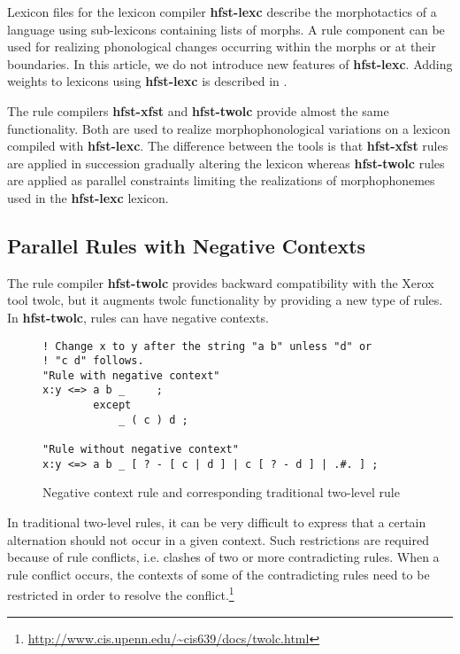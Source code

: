 \documentclass{llncs}
\begin{document}
Lexicon files for the lexicon compiler \textbf{hfst-lexc} describe the morphotactics of a
language using sub-lexicons containing lists of morphs. A rule
component can be used for realizing phonological changes occurring 
within the morphs or at their boundaries. In this article, we do not introduce new features 
of \textbf{hfst-lexc}. Adding weights to lexicons using \textbf{hfst-lexc} is described in \cite{linden/2009/fsmnlp}.

The rule compilers \textbf{hfst-xfst} and \textbf{hfst-twolc} provide almost the same
functionality. Both are used to realize morphophonological variations
on a lexicon compiled with \textbf{hfst-lexc}. The difference between the tools is that
\textbf{hfst-xfst} rules are applied in succession gradually altering the
lexicon whereas \textbf{hfst-twolc} rules are applied as parallel constraints limiting
the realizations of morphophonemes used in the \textbf{hfst-lexc} lexicon.

\subsection{Parallel Rules with Negative Contexts}

The rule compiler \textbf{hfst-twolc} provides backward compatibility with the
Xerox tool twolc, but it augments twolc functionality by providing a new type of rules. 
In \textbf{hfst-twolc}, rules can have negative contexts.
\begin{figure}
{\footnotesize
\begin{verbatim}
! Change x to y after the string "a b" unless "d" or 
! "c d" follows.
"Rule with negative context"
x:y <=> a b _     ;
        except
            _ ( c ) d ;

"Rule without negative context"
x:y <=> a b _ [ ? - [ c | d ] | c [ ? - d ] | .#. ] ;
\end{verbatim}
}
\caption{Negative context rule and corresponding traditional two-level
  rule}\label{negative-context-rule}
\end{figure}

In traditional two-level rules, it can be very difficult to express
that a certain alternation should not occur in a given context. Such
restrictions are required because of rule conflicts, i.e. clashes of
two or more contradicting rules. When a rule conflict occurs, the
contexts of some of the contradicting rules need to be restricted in
order to resolve the
conflict.\footnote{\url{http://www.cis.upenn.edu/~cis639/docs/twolc.html}}
\end{document}

